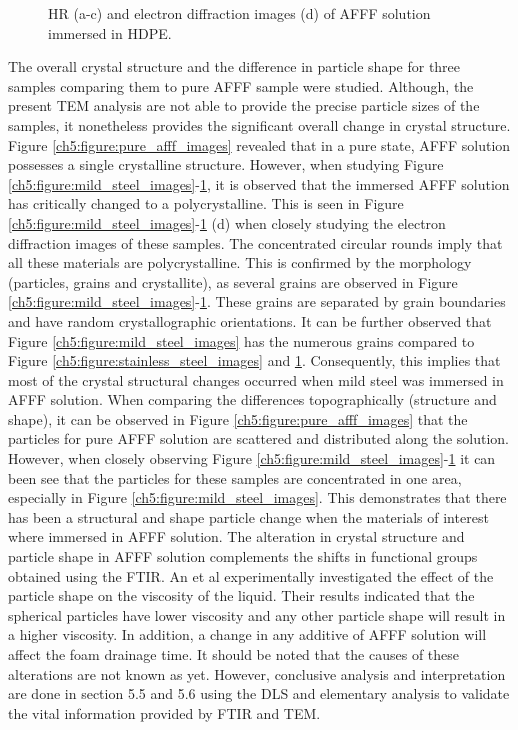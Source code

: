 \documentclass[12pt]{report}
\begin{document}
\begin{figure}[H]
\caption{HR (a-c) and electron diffraction images (d) of AFFF solution immersed in HDPE.}
\label{ch5:figure:hdpe_images}
\end{figure}

The overall crystal structure and the difference in particle shape for three samples comparing them to pure AFFF sample were studied. Although, the present TEM analysis are not able to provide the precise particle sizes of the samples, it nonetheless provides the significant overall change in crystal structure. Figure \ref{ch5:figure:pure_afff_images} revealed that in a pure state, AFFF solution possesses a single crystalline structure. However, when studying Figure \ref{ch5:figure:mild_steel_images}-\ref{ch5:figure:hdpe_images}, it is observed that the immersed AFFF solution has critically changed to a polycrystalline. This is seen in Figure \ref{ch5:figure:mild_steel_images}-\ref{ch5:figure:hdpe_images} (d) when closely studying the electron diffraction images of these samples. The concentrated circular rounds imply that all these materials are polycrystalline. This is confirmed by the morphology (particles, grains and crystallite), as several grains are observed in Figure \ref{ch5:figure:mild_steel_images}-\ref{ch5:figure:hdpe_images}. These grains are separated by grain boundaries and have random crystallographic orientations. It can be further observed that Figure \ref{ch5:figure:mild_steel_images} has the numerous grains compared to Figure \ref{ch5:figure:stainless_steel_images} and \ref{ch5:figure:hdpe_images}.  Consequently, this implies that most of the crystal structural changes occurred when mild steel was immersed in AFFF solution. 
When comparing the differences topographically (structure and shape), it can be observed in Figure \ref{ch5:figure:pure_afff_images} that the particles for pure AFFF solution are scattered and distributed along the solution. However, when closely observing Figure \ref{ch5:figure:mild_steel_images}-\ref{ch5:figure:hdpe_images} it can been see that the particles for these samples are concentrated in one area, especially in Figure \ref{ch5:figure:mild_steel_images}. This demonstrates that there has been a structural and shape particle change when the materials of interest where immersed in AFFF solution. The alteration in crystal structure and particle shape in AFFF solution complements the shifts in functional groups obtained using the FTIR. An et al \cite{lin1991handbook} experimentally investigated the effect of the particle shape on the viscosity of the liquid. Their results indicated that the spherical particles have lower viscosity and any other particle shape will result in a higher viscosity. In addition, a change in any additive of AFFF solution will affect the foam drainage time. It should be noted that the causes of these alterations are not known as yet. However, conclusive analysis and interpretation are done in section 5.5 and 5.6 using the DLS and elementary analysis to validate the vital information provided by FTIR and TEM.
\end{document}
